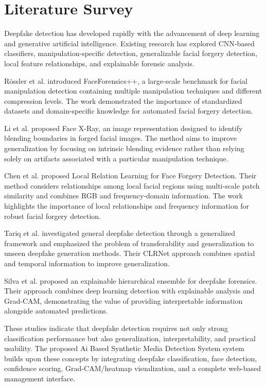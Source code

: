 \documentclass[12pt,a4paper,oneside]{report}
\begin{document}
\chapter{Literature Survey}

Deepfake detection has developed rapidly with the advancement of deep learning and generative artificial intelligence. Existing research has explored CNN-based classifiers, manipulation-specific detection, generalizable facial forgery detection, local feature relationships, and explainable forensic analysis.

Rössler et al. introduced FaceForensics++, a large-scale benchmark for facial manipulation detection containing multiple manipulation techniques and different compression levels. The work demonstrated the importance of standardized datasets and domain-specific knowledge for automated facial forgery detection.

Li et al. proposed Face X-Ray, an image representation designed to identify blending boundaries in forged facial images. The method aims to improve generalization by focusing on intrinsic blending evidence rather than relying solely on artifacts associated with a particular manipulation technique.

Chen et al. proposed Local Relation Learning for Face Forgery Detection. Their method considers relationships among local facial regions using multi-scale patch similarity and combines RGB and frequency-domain information. The work highlights the importance of local relationships and frequency information for robust facial forgery detection.

Tariq et al. investigated general deepfake detection through a generalized framework and emphasized the problem of transferability and generalization to unseen deepfake generation methods. Their CLRNet approach combines spatial and temporal information to improve generalization.

Silva et al. proposed an explainable hierarchical ensemble for deepfake forensics. Their approach combines deep learning detection with explainable analysis and Grad-CAM, demonstrating the value of providing interpretable information alongside automated predictions.

These studies indicate that deepfake detection requires not only strong classification performance but also generalization, interpretability, and practical usability. The proposed Ai Based Synthetic Media Detection System system builds upon these concepts by integrating deepfake classification, face detection, confidence scoring, Grad-CAM/heatmap visualization, and a complete web-based management interface.
\end{document}
